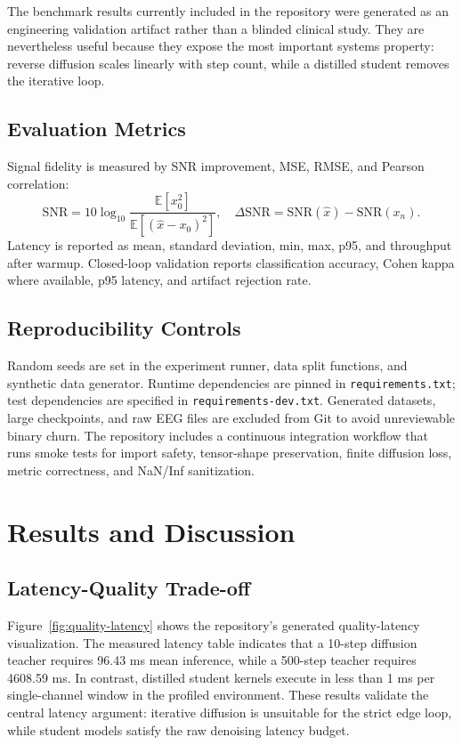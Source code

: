 \documentclass[11pt]{article}
\newcommand{\snr}{\mathrm{SNR}}
\begin{document}
The benchmark results currently included in the repository were generated as an engineering validation artifact rather than a blinded clinical study. They are nevertheless useful because they expose the most important systems property: reverse diffusion scales linearly with step count, while a distilled student removes the iterative loop.

\subsection{Evaluation Metrics}

Signal fidelity is measured by SNR improvement, MSE, RMSE, and Pearson correlation:
\[
\snr = 10 \log_{10}\frac{\mathbb{E}[x_0^2]}{\mathbb{E}[(\hat{x}-x_0)^2]},
\quad
\Delta\snr = \snr(\hat{x}) - \snr(x_n).
\]
Latency is reported as mean, standard deviation, min, max, p95, and throughput after warmup. Closed-loop validation reports classification accuracy, Cohen kappa where available, p95 latency, and artifact rejection rate.

\subsection{Reproducibility Controls}

Random seeds are set in the experiment runner, data split functions, and synthetic data generator. Runtime dependencies are pinned in \texttt{requirements.txt}; test dependencies are specified in \texttt{requirements-dev.txt}. Generated datasets, large checkpoints, and raw EEG files are excluded from Git to avoid unreviewable binary churn. The repository includes a continuous integration workflow that runs smoke tests for import safety, tensor-shape preservation, finite diffusion loss, metric correctness, and NaN/Inf sanitization.

\section{Results and Discussion}

\subsection{Latency-Quality Trade-off}

Figure~\ref{fig:quality-latency} shows the repository's generated quality-latency visualization. The measured latency table indicates that a 10-step diffusion teacher requires 96.43 ms mean inference, while a 500-step teacher requires 4608.59 ms. In contrast, distilled student kernels execute in less than 1 ms per single-channel window in the profiled environment. These results validate the central latency argument: iterative diffusion is unsuitable for the strict edge loop, while student models satisfy the raw denoising latency budget.
\end{document}
